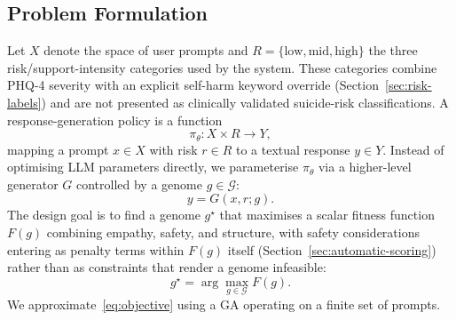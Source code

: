 \documentclass[mathematics,article,submit,xetex,moreauthors]{Definitions/mdpi}
\begin{document}
\subsection{Problem Formulation}

Let \(X\) denote the space of user prompts and
\(R = \{\mathrm{low}, \mathrm{mid}, \mathrm{high}\}\) the three
risk/support-intensity categories used by the system. These categories
combine PHQ-4 severity with an explicit self-harm keyword override
(Section~\ref{sec:risk-labels}) and are not presented as clinically
validated suicide-risk classifications. A response-generation policy is a function
\begin{equation}
  \pi_{\theta} : X \times R \rightarrow Y,
\end{equation}
mapping a prompt \(x \in X\) with risk \(r \in R\) to a textual response
\(y \in Y\). Instead of optimising LLM parameters directly, we parameterise
\(\pi_{\theta}\) via a higher-level generator \(G\) controlled by a genome
\(g \in \mathcal{G}\):
\begin{equation}
\label{eq:generator}
  y = G(x, r; g).
\end{equation}
The design goal is to find a genome \(g^{\star}\) that maximises a scalar
fitness function \(F(g)\) combining empathy, safety, and structure, with
safety considerations entering as penalty terms within $F(g)$ itself
(Section~\ref{sec:automatic-scoring}) rather than as constraints that
render a genome infeasible:
\begin{equation}
\label{eq:objective}
  g^{\star} = \arg\max_{g \in \mathcal{G}} F(g).
\end{equation}
We approximate~\eqref{eq:objective} using a GA operating on a finite set of
prompts.
\end{document}
